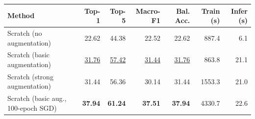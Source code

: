 \begin{tabular}{lrrrrrr}
\toprule
Method & Top-1 & Top-5 & Macro-F1 & Bal. Acc. & Train (s) & Infer (s) \\
\midrule
Scratch (no augmentation) & 22.62 & 44.38 & 22.52 & 22.62 & 887.4 & 6.1 \\
Scratch (basic augmentation) & \underline{31.76} & \underline{57.42} & \underline{31.44} & \underline{31.76} & 863.8 & 21.1 \\
Scratch (strong augmentation) & 31.44 & 56.36 & 30.14 & 31.44 & 1553.3 & 21.0 \\
Scratch (basic aug., 100-epoch SGD) & \textbf{37.94} & \textbf{61.24} & \textbf{37.51} & \textbf{37.94} & 4330.7 & 22.6 \\
\bottomrule
\end{tabular}
